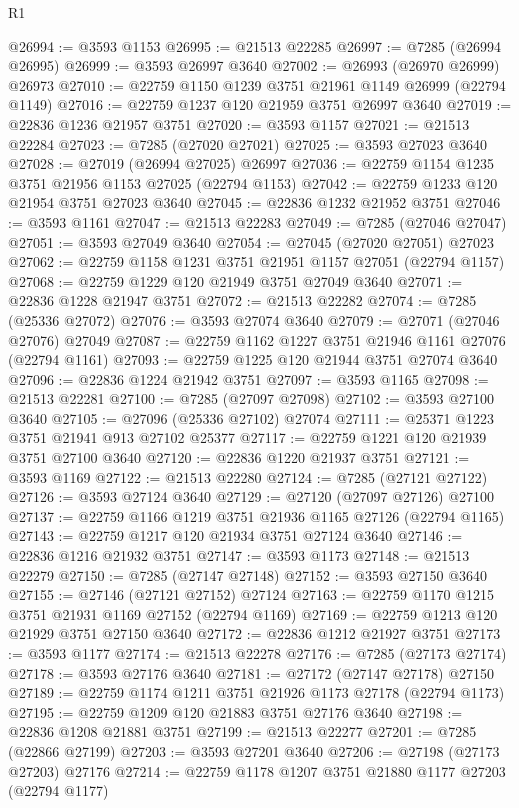 \begin{lexlean}{R1}
\begin{coremodule}
@26994 := @3593 @1153
@26995 := @21513 @22285
@26997 := @7285 (@26994 @26995)
@26999 := @3593 @26997 @3640
@27002 := @26993 (@26970 @26999) @26973
@27010 := @22759 @1150 @1239 @3751 @21961 @1149 @26999 (@22794 @1149)
@27016 := @22759 @1237 @120 @21959 @3751 @26997 @3640
@27019 := @22836 @1236 @21957 @3751
@27020 := @3593 @1157
@27021 := @21513 @22284
@27023 := @7285 (@27020 @27021)
@27025 := @3593 @27023 @3640
@27028 := @27019 (@26994 @27025) @26997
@27036 := @22759 @1154 @1235 @3751 @21956 @1153 @27025 (@22794 @1153)
@27042 := @22759 @1233 @120 @21954 @3751 @27023 @3640
@27045 := @22836 @1232 @21952 @3751
@27046 := @3593 @1161
@27047 := @21513 @22283
@27049 := @7285 (@27046 @27047)
@27051 := @3593 @27049 @3640
@27054 := @27045 (@27020 @27051) @27023
@27062 := @22759 @1158 @1231 @3751 @21951 @1157 @27051 (@22794 @1157)
@27068 := @22759 @1229 @120 @21949 @3751 @27049 @3640
@27071 := @22836 @1228 @21947 @3751
@27072 := @21513 @22282
@27074 := @7285 (@25336 @27072)
@27076 := @3593 @27074 @3640
@27079 := @27071 (@27046 @27076) @27049
@27087 := @22759 @1162 @1227 @3751 @21946 @1161 @27076 (@22794 @1161)
@27093 := @22759 @1225 @120 @21944 @3751 @27074 @3640
@27096 := @22836 @1224 @21942 @3751
@27097 := @3593 @1165
@27098 := @21513 @22281
@27100 := @7285 (@27097 @27098)
@27102 := @3593 @27100 @3640
@27105 := @27096 (@25336 @27102) @27074
@27111 := @25371 @1223 @3751 @21941 @913 @27102 @25377
@27117 := @22759 @1221 @120 @21939 @3751 @27100 @3640
@27120 := @22836 @1220 @21937 @3751
@27121 := @3593 @1169
@27122 := @21513 @22280
@27124 := @7285 (@27121 @27122)
@27126 := @3593 @27124 @3640
@27129 := @27120 (@27097 @27126) @27100
@27137 := @22759 @1166 @1219 @3751 @21936 @1165 @27126 (@22794 @1165)
@27143 := @22759 @1217 @120 @21934 @3751 @27124 @3640
@27146 := @22836 @1216 @21932 @3751
@27147 := @3593 @1173
@27148 := @21513 @22279
@27150 := @7285 (@27147 @27148)
@27152 := @3593 @27150 @3640
@27155 := @27146 (@27121 @27152) @27124
@27163 := @22759 @1170 @1215 @3751 @21931 @1169 @27152 (@22794 @1169)
@27169 := @22759 @1213 @120 @21929 @3751 @27150 @3640
@27172 := @22836 @1212 @21927 @3751
@27173 := @3593 @1177
@27174 := @21513 @22278
@27176 := @7285 (@27173 @27174)
@27178 := @3593 @27176 @3640
@27181 := @27172 (@27147 @27178) @27150
@27189 := @22759 @1174 @1211 @3751 @21926 @1173 @27178 (@22794 @1173)
@27195 := @22759 @1209 @120 @21883 @3751 @27176 @3640
@27198 := @22836 @1208 @21881 @3751
@27199 := @21513 @22277
@27201 := @7285 (@22866 @27199)
@27203 := @3593 @27201 @3640
@27206 := @27198 (@27173 @27203) @27176
@27214 := @22759 @1178 @1207 @3751 @21880 @1177 @27203 (@22794 @1177)

\end{coremodule}
\end{lexlean}
